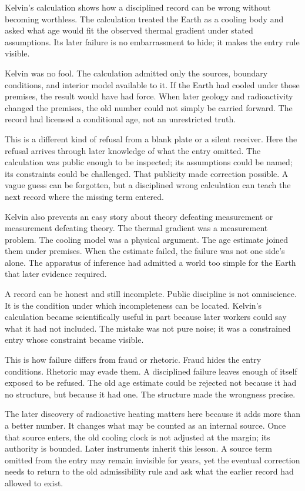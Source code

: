Kelvin's calculation shows how a disciplined record can be wrong without
becoming worthless. The calculation treated the Earth as a cooling body
and asked what age would fit the observed thermal gradient under stated
assumptions. Its later failure is no embarrassment to hide; it makes the
entry rule visible.

Kelvin was no fool. The calculation admitted only the sources, boundary
conditions, and interior model available to it. If the Earth had cooled
under those premises, the result would have had force. When later
geology and radioactivity changed the premises, the old number could not
simply be carried forward. The record had licensed a conditional age,
not an unrestricted truth.

This is a different kind of refusal from a blank plate or a silent
receiver. Here the refusal arrives through later knowledge of what the
entry omitted. The calculation was public enough to be inspected; its
assumptions could be named; its constraints could be challenged. That
publicity made correction possible. A vague guess can be forgotten, but a
disciplined wrong calculation can teach the next record where the
missing term entered.

Kelvin also prevents an easy story about theory defeating measurement or
measurement defeating theory. The thermal gradient was a measurement
problem. The cooling model was a physical argument. The age estimate
joined them under premises. When the estimate failed, the failure was
not one side's alone. The apparatus of inference had admitted a world
too simple for the Earth that later evidence required.

A record can be honest and still incomplete. Public discipline is not
omniscience. It is the condition under which incompleteness can be
located. Kelvin's calculation became scientifically useful in part
because later workers could say what it had not included. The mistake
was not pure noise; it was a constrained entry whose constraint became
visible.

This is how failure differs from fraud or rhetoric. Fraud hides the entry
conditions. Rhetoric may evade them. A disciplined failure leaves enough
of itself exposed to be refused. The old age estimate could be rejected
not because it had no structure, but because it had one. The structure
made the wrongness precise.

The later discovery of radioactive heating matters here because it adds
more than a better number. It changes what may be counted as an internal
source. Once that source enters, the old cooling clock is not adjusted
at the margin; its authority is bounded. Later instruments inherit this
lesson. A source term omitted from the entry may remain invisible for
years, yet the eventual correction needs to return to the old
admissibility rule and ask what the earlier record had allowed to exist.


